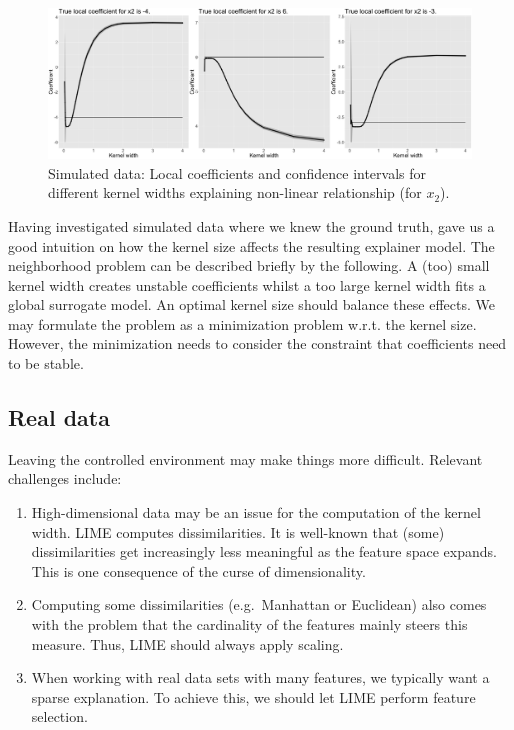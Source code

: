 \documentclass[]{krantz}
\begin{document}
\begin{figure}

{\centering \includegraphics[width=0.99\linewidth]{images/04-09-13} 

}

\caption{Simulated data: Local coefficients and confidence intervals for different kernel widths explaining non-linear relationship (for $x_2$).}\label{fig:lime-fig13}
\end{figure}

Having investigated simulated data where we knew the ground truth, gave
us a good intuition on how the kernel size affects the resulting
explainer model. The neighborhood problem can be described briefly by
the following. A (too) small kernel width creates unstable coefficients
whilst a too large kernel width fits a global surrogate model. An
optimal kernel size should balance these effects. We may formulate the
problem as a minimization problem w.r.t. the kernel size. However, the
minimization needs to consider the constraint that coefficients need to
be stable.

\subsection{Real data}\label{id42}

Leaving the controlled environment may make things more difficult.
Relevant challenges include:

\begin{enumerate}
\def\labelenumi{\arabic{enumi}.}
\item
  High-dimensional data may be an issue for the computation of the
  kernel width. LIME computes dissimilarities. It is well-known that
  (some) dissimilarities get increasingly less meaningful as the feature
  space expands. This is one consequence of the curse of dimensionality.
\item
  Computing some dissimilarities (e.g.~Manhattan or Euclidean) also
  comes with the problem that the cardinality of the features mainly
  steers this measure. Thus, LIME should always apply scaling.
\item
  When working with real data sets with many features, we typically want
  a sparse explanation. To achieve this, we should let LIME perform
  feature selection.
\end{enumerate}
\end{document}
